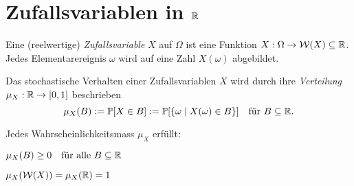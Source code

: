 


\section{Zufallsvariablen in \(\mathbb{R}\)}

\begin{definition}[Zufallsvariable]
	Eine (reelwertige) \emph{Zufallsvariable} \(X\) auf \(\Omega\) ist eine Funktion \(X:\Omega \rightarrow \mathcal{W}(X) \subseteq \mathbb{R}\). Jedes Elementarereignis \(\omega\) wird auf eine Zahl \(X(\omega)\) abgebildet.
\end{definition}

\begin{definition}[Verteilung]
	Das stochastische Verhalten einer Zufallsvariablen \(X\) wird durch ihre \emph{Verteilung} \(\mu_X :\mathbb{R} \rightarrow[0,1]\) beschrieben
	\[
		\mu_X(B) := \mathbb{P}[X \in B] := \mathbb{P}[\{\omega \mid X(\omega) \in B\}]
		\quad
		\text{für } B \subseteq \mathbb{R}.
	\]

	\begin{note}
		Jedes Wahrscheinlichkeitsmass \(\mu_X\) erfüllt:
		\begin{compactenum}
			\item \(\mu_X(B) \geq 0 \quad \text{für alle } B \subseteq \mathbb{R} \)
			\item \(\mu_X(\mathcal{W}(X)) = \mu_X(\mathbb{R}) = 1\)
		\end{compactenum}
	\end{note}

\end{definition}


